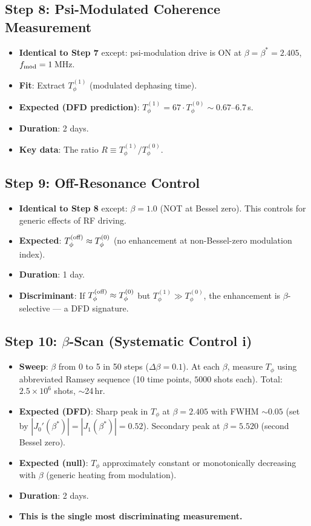 \documentclass[11pt]{article}
\theoremstyle{definition}
\theoremstyle{remark}
\newcommand{\ee}[1]{\times 10^{#1}}
\begin{document}
\subsection{Step 8: Psi-Modulated Coherence Measurement}

\begin{itemize}[nosep]
\item \textbf{Identical to Step 7} except: psi-modulation drive is ON
  at $\beta = \beta^* = 2.405$, $f_{\rm mod} = 1$\,MHz.
\item \textbf{Fit}: Extract $T_\phi^{(1)}$ (modulated dephasing time).
\item \textbf{Expected (DFD prediction)}: $T_\phi^{(1)} = 67 \cdot
  T_\phi^{(0)} \sim 0.67$--6.7\,s.
\item \textbf{Duration}: 2 days.
\item \textbf{Key data}: The ratio $R \equiv T_\phi^{(1)}/T_\phi^{(0)}$.
\end{itemize}

\subsection{Step 9: Off-Resonance Control}

\begin{itemize}[nosep]
\item \textbf{Identical to Step 8} except: $\beta = 1.0$ (NOT at Bessel
  zero). This controls for generic effects of RF driving.
\item \textbf{Expected}: $T_\phi^{(\rm off)} \approx T_\phi^{(0)}$
  (no enhancement at non-Bessel-zero modulation index).
\item \textbf{Duration}: 1 day.
\item \textbf{Discriminant}: If $T_\phi^{(\rm off)} \approx T_\phi^{(0)}$
  but $T_\phi^{(1)} \gg T_\phi^{(0)}$, the enhancement is
  $\beta$-selective --- a DFD signature.
\end{itemize}

\subsection{Step 10: $\beta$-Scan (Systematic Control i)}

\begin{itemize}[nosep]
\item \textbf{Sweep}: $\beta$ from 0 to 5 in 50 steps ($\Delta\beta = 0.1$).
  At each $\beta$, measure $T_\phi$ using abbreviated Ramsey sequence
  (10 time points, $5000$ shots each). Total: $2.5\ee{6}$ shots,
  $\sim$24\,hr.
\item \textbf{Expected (DFD)}: Sharp peak in $T_\phi$ at $\beta = 2.405$
  with FWHM $\sim 0.05$ (set by $|J_0'(\beta^*)| = |J_1(\beta^*)| = 0.52$).
  Secondary peak at $\beta = 5.520$ (second Bessel zero).
\item \textbf{Expected (null)}: $T_\phi$ approximately constant or
  monotonically decreasing with $\beta$ (generic heating from modulation).
\item \textbf{Duration}: 2 days.
\item \textbf{This is the single most discriminating measurement.}
\end{itemize}
\end{document}
